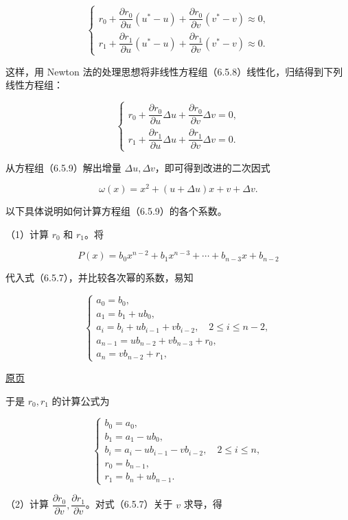 \documentclass[
  10pt,
  fontset=fandol]{ctexart}
\begin{document}
\[
\begin{cases}
r_0+\dfrac{\partial r_0}{\partial u}(u^*-u)+\dfrac{\partial r_0}{\partial v}(v^*-v)\approx0,\\
r_1+\dfrac{\partial r_1}{\partial u}(u^*-u)+\dfrac{\partial r_1}{\partial v}(v^*-v)\approx0.
\end{cases}
\]

这样，用 Newton 法的处理思想将非线性方程组（6.5.8）线性化，归结得到下列线性方程组：

\[
\begin{cases}
r_0+\dfrac{\partial r_0}{\partial u}\Delta u+\dfrac{\partial r_0}{\partial v}\Delta v=0,\\
r_1+\dfrac{\partial r_1}{\partial u}\Delta u+\dfrac{\partial r_1}{\partial v}\Delta v=0.
\end{cases}
\tag{6.5.9}
\]

从方程组（6.5.9）解出增量 \(\Delta u,\Delta v\)，即可得到改进的二次因式

\[
\omega(x)=x^2+(u+\Delta u)x+v+\Delta v.
\]

以下具体说明如何计算方程组（6.5.9）的各个系数。

（1）计算 \(r_0\) 和 \(r_1\)。将

\[
P(x)=b_0x^{n-2}+b_1x^{n-3}+\cdots+b_{n-3}x+b_{n-2}
\]

代入式（6.5.7），并比较各次幂的系数，易知

\[
\begin{cases}
a_0=b_0,\\
a_1=b_1+ub_0,\\
a_i=b_i+ub_{i-1}+vb_{i-2},\quad2\leqslant i\leqslant n-2,\\
a_{n-1}=ub_{n-2}+vb_{n-3}+r_0,\\
a_n=vb_{n-2}+r_1,
\end{cases}
\]

\href{../../source-images/pdf-174.jpeg}{原页}

于是 \(r_0,r_1\) 的计算公式为

\[
\begin{cases}
b_0=a_0,\\
b_1=a_1-ub_0,\\
b_i=a_i-ub_{i-1}-vb_{i-2},\quad2\leqslant i\leqslant n,\\
r_0=b_{n-1},\\
r_1=b_n+ub_{n-1}.
\end{cases}
\tag{6.5.10}
\]

（2）计算 \(\dfrac{\partial r_0}{\partial v},\dfrac{\partial r_1}{\partial v}\)。对式（6.5.7）关于 \(v\) 求导，得
\end{document}
